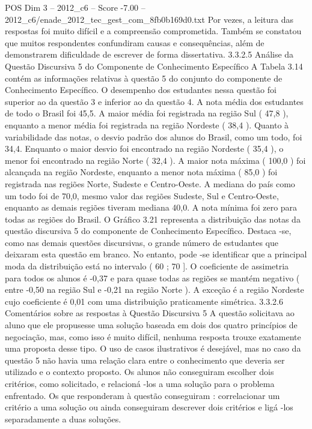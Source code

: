 \begin{textsample}{POS Dim 3 – 2012\_c6 – Score -7.00 – 2012\_c6/enade\_2012\_tec\_gest\_com\_8fb0b169d0.txt}
Por vezes, a leitura das respostas foi muito difícil e a compreensão comprometida.
Também se constatou que muitos respondentes confundiram causas e consequências, além de demonstrarem dificuldade de escrever de forma dissertativa. 3.3.2.5 Análise da Questão Discursiva 5 do Componente de Conhecimento Específico A Tabela 3.14 contém as informações relativas à questão 5 do conjunto do componente de Conhecimento Específico.
O desempenho dos estudantes nessa questão foi superior ao da questão 3 e inferior ao da questão 4.
A nota média dos estudantes de todo o Brasil foi 45,5.
A maior média foi registrada na região Sul ( 47,8 ), enquanto a menor média foi registrada na região Nordeste ( 38,4 ).
Quanto à variabilidade das notas, o desvio padrão dos alunos do Brasil, como um todo, foi 34,4.
Enquanto o maior desvio foi encontrado na região Nordeste ( 35,4 ), o menor foi encontrado na região Norte ( 32,4 ).
A maior nota máxima ( 100,0 ) foi alcançada na região Nordeste, enquanto a menor nota máxima ( 85,0 ) foi registrada nas regiões Norte, Sudeste e Centro-Oeste.
A mediana do país como um todo foi de 70,0, mesmo valor das regiões Sudeste, Sul e Centro-Oeste, enquanto as demais regiões tiveram mediana 40,0.
A nota mínima foi zero para todas as regiões do Brasil.
O Gráfico 3.21 representa a distribuição das notas da questão discursiva 5 do componente de Conhecimento Específico.
Destaca -se, como nas demais questões discursivas, o grande número de estudantes que deixaram esta questão em branco.
No entanto, pode -se identificar que a principal moda da distribuição está no intervalo ( 60 ; 70 ].
O coeficiente de assimetria para todos os alunos é -0,37 e para quase todas as regiões se mantém negativo ( entre -0,50 na região Sul e -0,21 na região Norte ).
A exceção é a região Nordeste cujo coeficiente é 0,01 com uma distribuição praticamente simétrica. 3.3.2.6 Comentários sobre as respostas à Questão Discursiva 5 A questão solicitava ao aluno que ele propusesse uma solução baseada em dois dos quatro princípios de negociação, mas, como isso é muito difícil, nenhuma resposta trouxe exatamente uma proposta desse tipo.
O uso de casos ilustrativos é desejável, mas no caso da questão 5 não havia uma relação clara entre o conhecimento que deveria ser utilizado e o contexto proposto.
Os alunos não conseguiram escolher dois critérios, como solicitado, e relacioná -los a uma solução para o problema enfrentado.
Os que responderam à questão conseguiram : correlacionar um critério a uma solução ou ainda conseguiram descrever dois critérios e ligá -los separadamente a duas soluções.

\end{textsample}
